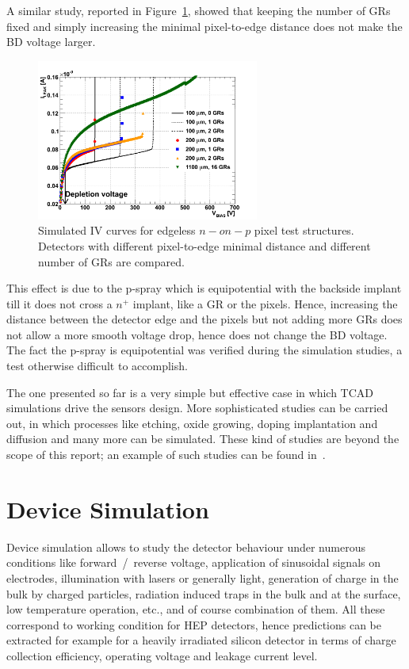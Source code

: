 A similar study, reported in Figure~\ref{fig:width_GRs}, showed that keeping the number of GRs fixed and simply increasing the 
minimal pixel-to-edge distance does not make the BD voltage larger.

\begin{figure}[!htbp]
\centering
\includegraphics[width=0.65\textwidth]{edgeless_BD_FL0_BandW_mix}
\caption{\label{fig:width_GRs}Simulated IV curves for edgeless $n-on-p$ pixel test structures. Detectors with different pixel-to-edge minimal distance 
and different number of GRs are compared.}
\end{figure}

This effect is due to the p-spray which is equipotential with the backside implant till it does not cross a $n^+$ implant, like a 
GR or the pixels. Hence, increasing the distance between the detector edge and the pixels but 
not adding more GRs does not allow a more smooth voltage drop, hence does not change the 
BD voltage. The fact the p-spray is equipotential was verified during the simulation studies, a test 
otherwise difficult to accomplish.


The one presented so far is a very simple but effective case in which TCAD simulations drive the 
sensors design. More sophisticated studies can be carried out, in which processes like 
etching, oxide growing, doping implantation and diffusion and many more can be simulated. 
These kind of studies are beyond the scope of this report; an example of such studies 
can be found in~\cite{CISSIMDET2014}. 

\section{Device Simulation}
\label{sec:sensorsimulation}

Device simulation allows to study the detector behaviour under numerous conditions like 
forward~/~reverse voltage, application of sinusoidal signals on electrodes, illumination with lasers or 
generally light, generation of charge in the 
bulk by charged particles, radiation induced traps in the bulk and at the surface, low temperature 
operation, etc., 
and of course combination of them.
All these correspond to working condition for HEP detectors, hence predictions can be extracted 
for example for a heavily irradiated silicon detector in terms of charge collection efficiency, operating 
voltage and leakage current level.

